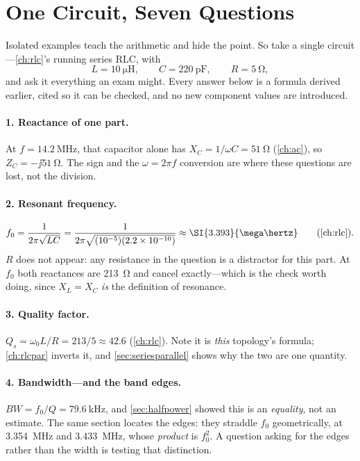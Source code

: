 \section{One Circuit, Seven Questions}
\label{sec:onecircuit}
Isolated examples teach the arithmetic and hide the point. So take a single
circuit---\cref{ch:rlc}'s running series RLC, with
\[
L=\SI{10}{\micro\henry},
\qquad
C=\SI{220}{\pico\farad},
\qquad
R=\SI{5}{\ohm},
\]
and ask it everything an exam might. Every answer below is a formula derived earlier,
cited so it can be checked, and no new component values are introduced.

\paragraph{1. Reactance of one part.}
At \(f=\SI{14.2}{\mega\hertz}\), that capacitor alone has
\(X_C=1/\omega C=\SI{51}{\ohm}\) (\cref{ch:ac}), so \(Z_C=-\jj\SI{51}{\ohm}\). The
sign and the \(\omega=2\pi f\) conversion are where these questions are lost, not the
division.

\paragraph{2. Resonant frequency.}
\[
f_0=\frac{1}{2\pi\sqrt{LC}}
=\frac{1}{2\pi\sqrt{(10^{-5})(2.2\times10^{-10})}}
\approx\SI{3.393}{\mega\hertz}
\qquad(\cref{ch:rlc}).
\]
\(R\) does not appear: any resistance in the question is a distractor for this part.
At \(f_0\) both reactances are \SI{213}{\ohm} and cancel exactly---which is the check
worth doing, since \(X_L=X_C\) \emph{is} the definition of resonance.

\paragraph{3. Quality factor.}
\(Q_s=\omega_0L/R=213/5\approx42.6\) (\cref{ch:rlc}). Note it is
\emph{this} topology's formula; \cref{ch:rlcpar} inverts it, and
\cref{sec:seriesparallel} shows why the two are one quantity.

\paragraph{4. Bandwidth---and the band edges.}
\(BW=f_0/Q=\SI{79.6}{\kilo\hertz}\), and \cref{sec:halfpower} showed this is an
\emph{equality}, not an estimate. The same section locates the edges: they straddle
\(f_0\) geometrically, at \SI{3.354}{\mega\hertz} and \SI{3.433}{\mega\hertz}, whose
\emph{product} is \(f_0^2\). A question asking for the edges rather than the width is
testing that distinction.

